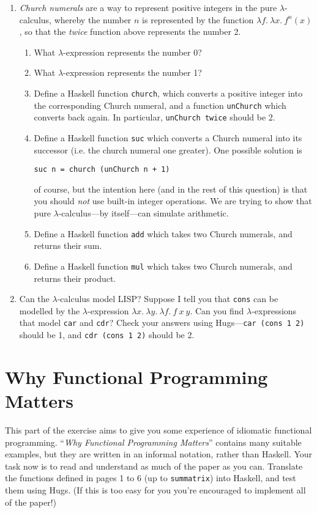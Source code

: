 \documentclass{article}
\begin{document}
\begin{enumerate}
\item
{\em Church numerals} are a way to represent positive integers in the
pure $\lambda$-calculus, whereby the number $n$ is represented by the
function $\lambda f.~\lambda x.~f^n(x)$, so that the {\it twice}
function above represents the number 2.
\begin{enumerate}
\item
What $\lambda$-expression represents the number 0? 
\item
What $\lambda$-expression represents the number 1? 
\item 
Define a Haskell function \verb!church!, which converts a positive
integer into the corresponding Church numeral, and a function
\verb!unChurch! which converts back again. In particular,
\verb!unChurch twice! should be 2. 
\item 
Define a Haskell function \verb!suc! which converts a Church numeral
into its successor (i.e. the church numeral one greater). One possible
solution is 
\begin{verbatim}
suc n = church (unChurch n + 1)
\end{verbatim}
of course, but the intention here (and in the rest of this question)
is that you should {\em not} use built-in integer operations. We are
trying to show that pure $\lambda$-calculus---by itself---can simulate
arithmetic. 
\item 
Define a Haskell function \verb!add! which takes two Church numerals,
and returns their sum. 
\item 
Define a Haskell function \verb!mul! which takes two Church numerals,
and returns their product. 
\end{enumerate}
\item 
Can the $\lambda$-calculus model LISP? Suppose I tell you that
\verb!cons! can be modelled by the $\lambda$-expression $\lambda
x.~\lambda y.~\lambda f.~f~x~y$. Can you find $\lambda$-expressions
that model \verb!car! and \verb!cdr!? Check your answers using
Hugs---\verb!car (cons 1 2)! should be 1, and \verb!cdr (cons 1 2)!
should be 2.

\end{enumerate}


\section{Why Functional Programming Matters\protect{}\protect\marginpar[r]{\bf [2/function]}}
This part of the exercise aims to give you some
experience of idiomatic functional programming. ``{\em Why Functional
  Programming Matters}'' contains many suitable examples, but they are
written in an informal notation, rather than Haskell. Your task now is
to read and understand as much of the paper as you can. Translate the
functions defined in pages 1 to 6 (up to \texttt{summatrix}) into
Haskell, and test them using Hugs. (If this is too easy for you you're
encouraged to implement all of the paper!)
\end{document}
